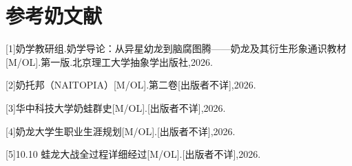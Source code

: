 
\clearpage
\section[参考文献]{参考奶文献}

\begingroup
\small\sffamily
\setlength{\parindent}{0pt}
[1]奶学教研组.奶学导论：从异星幼龙到脑腐图腾——奶龙及其衍生形象通识教材[M/OL].第一版.北京理工大学抽象学出版社,2026.

[2]奶托邦（NAITOPIA）[M/OL].第二卷[出版者不详],2026.

[3]华中科技大学奶蛙群史[M/OL].[出版者不详],2026.

[4]奶龙大学生职业生涯规划[M/OL].[出版者不详],2026.

[5]10.10 蛙龙大战全过程详细经过[M/OL].[出版者不详],2026.
\par
\endgroup



